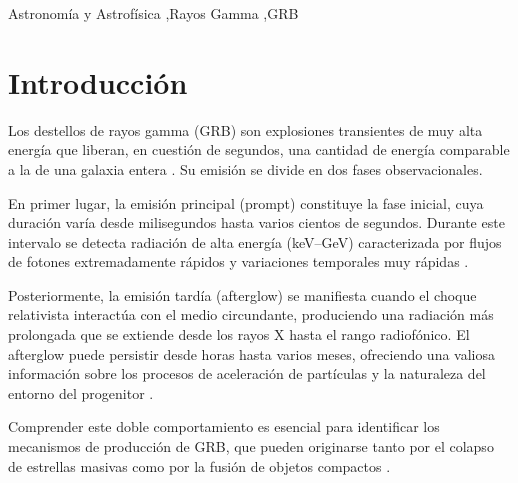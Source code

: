 \documentclass[final,5p,times,twocolumn,authoryear]{elsarticle}
\begin{document}
\begin{frontmatter}

\begin{keyword}
Astronomía y Astrofísica \sep Rayos Gamma \sep GRB



\end{keyword}


\end{frontmatter}




\section{Introducción}
\label{introduction}

Los destellos de rayos gamma (GRB) son explosiones transientes de muy alta energía que liberan, en cuestión de segundos, una cantidad de energía comparable a la de una galaxia entera \citep{kouveliotou1993,piran1999}.  Su emisión se divide en dos fases observacionales.

En primer lugar, la emisión principal (prompt) constituye la fase inicial, cuya duración varía desde milisegundos hasta varios cientos de segundos.  Durante este intervalo se detecta radiación de alta energía (keV–GeV) caracterizada por flujos de fotones extremadamente rápidos y variaciones temporales muy rápidas \citep{gehrels2009,ackermann2009}.

Posteriormente, la emisión tardía (afterglow) se manifiesta cuando el choque relativista interactúa con el medio circundante, produciendo una radiación más prolongada que se extiende desde los rayos X hasta el rango radiofónico.  El afterglow puede persistir desde horas hasta varios meses, ofreciendo una valiosa información sobre los procesos de aceleración de partículas y la naturaleza del entorno del progenitor \citep{vanparadijs2000,sari1998}.

Comprender este doble comportamiento es esencial para identificar los mecanismos de producción de GRB, que pueden originarse tanto por el colapso de estrellas masivas como por la fusión de objetos compactos \citep{meszaros2006}.
\end{document}

